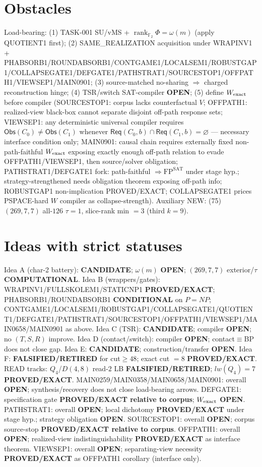 \documentclass[11pt]{article}
\begin{document}
\section*{Obstacles}
Load-bearing: (1) TASK-001 SU/vMS + $\operatorname{rank}_{\mathbb F_2}\Phi=\omega(m)$ (apply QUOTIENT1 first);
(2) SAME\_REALIZATION acquisition under WRAPINV1 + PHABSORB1/ROUNDABSORB1/CONTGAME1/LOCALSEM1/ROBUSTGAP1/COLLAPSEGATE1/DEFGATE1/PATHSTRAT1/SOURCESTOP1/OFFPATH1/VIEWSEP1/MAIN0901;
(3) source-matched no-sharing $\Rightarrow$ charged reconstruction hinge;
(4) TSR/switch SAT-compiler \textbf{OPEN};
(5) define $W_{\rm exact}$ before compiler (SOURCESTOP1: corpus lacks counterfactual $V$;
OFFPATH1: realized-view black-box cannot separate disjoint off-path response sets;
VIEWSEP1: any deterministic universal compiler requires $\mathsf{Obs}(C_0)\ne\mathsf{Obs}(C_1)$
whenever $\mathsf{Req}(C_0,b)\cap\mathsf{Req}(C_1,b)=\varnothing$ --- necessary interface condition only;
MAIN0901: causal chain requires externally fixed non-path-faithful $W_{\rm exact}$ exposing
exactly enough off-path relation to evade OFFPATH1/VIEWSEP1, then source/solver obligation;
PATHSTRAT1/DEFGATE1 fork: path-faithful $\Rightarrow\mathrm{FP}^{\mathrm{SAT}}$ under stage hyp.;
strategy-strengthened needs obligation theorem exposing off-path info;
ROBUSTGAP1 non-implication PROVED/EXACT; COLLAPSEGATE1 prices PSPACE-hard $W$ compiler as collapse-strength).
Auxiliary NEW: (75) $(269,7,7)$ all-$126$ $\tau{=}1$, slice-rank min $=3$ (third $k{=}9$).

\section*{Ideas with strict statuses}
Idea A (char-2 battery): \textbf{CANDIDATE}; $\omega(m)$ \textbf{OPEN}; $(269,7,7)$ exterior/$\tau$ \textbf{COMPUTATIONAL}.
Idea B (wrappers/gates): WRAPINV1/FULLSKOLEM1/STATICNP1 \textbf{PROVED/EXACT};
PHABSORB1/ROUNDABSORB1 \textbf{CONDITIONAL} on $P=NP$;
CONTGAME1/LOCALSEM1/ROBUSTGAP1/COLLAPSEGATE1/QUOTIENT1/DEFGATE1/PATHSTRAT1/SOURCESTOP1/OFFPATH1/VIEWSEP1/MAIN0658/MAIN0901 as above.
Idea C (TSR): \textbf{CANDIDATE}; compiler \textbf{OPEN}; no $(T,S,R)$ improve.
Idea D (contact/switch): compiler \textbf{OPEN}; contact$\equiv$BP does not close gap.
Idea E: \textbf{CANDIDATE}; construction/transfer \textbf{OPEN}.
Idea F: \textbf{FALSIFIED/RETIRED} for cut$\ge48$; exact cut $=8$ \textbf{PROVED/EXACT}.
READ tracks: $Q_4$/$D(4,8)$ read-$2$ LB \textbf{FALSIFIED/RETIRED}; $lw(Q_4)=7$ \textbf{PROVED/EXACT}.
MAIN0259/MAIN0358/MAIN0658/MAIN0901: overall \textbf{OPEN}; synthesis/recovery does not close load-bearing arrows.
DEFGATE1: specification gate \textbf{PROVED/EXACT relative to corpus}; $W_{\rm exact}$ \textbf{OPEN}.
PATHSTRAT1: overall \textbf{OPEN}; local dichotomy \textbf{PROVED/EXACT} under stage hyp.; strategy obligation \textbf{OPEN}.
SOURCESTOP1: overall \textbf{OPEN}; corpus source-stop \textbf{PROVED/EXACT relative to corpus}.
OFFPATH1: overall \textbf{OPEN}; realized-view indistinguishability \textbf{PROVED/EXACT} as interface theorem.
VIEWSEP1: overall \textbf{OPEN}; separating-view necessity \textbf{PROVED/EXACT} as OFFPATH1 corollary (interface only).
\end{document}

